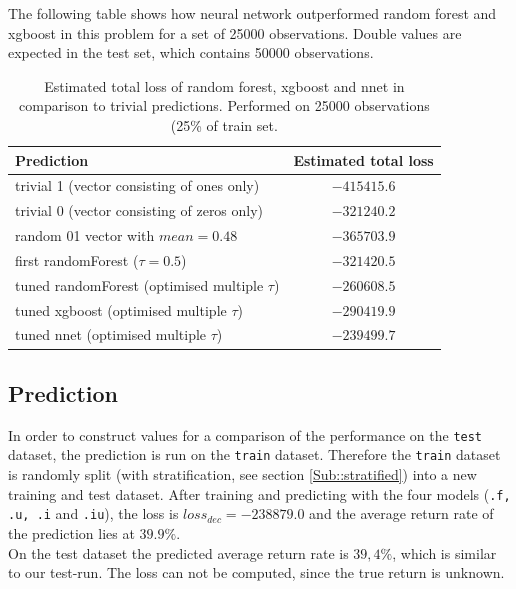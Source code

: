 \documentclass[a4paper,12pt]{article}
\begin{document}
The following table shows how neural network outperformed random forest and xgboost in this problem for a set of 25000 observations. Double values are expected in the test set, which contains 50000 observations.

\begin{table}[h]
\centering
\label{my-label}
\begin{tabular}{|lc|}
\hline
\textbf{Prediction} & \textbf{Estimated total loss} \\
\hline \hline
trivial 1 (vector consisting of ones only)                         &  $- 415415.6   $            \\
trivial 0 (vector consisting of zeros only)                       & $- 321240.2 $            \\
random 01 vector with $mean=0.48$                            &  $- 365703.9  $                \\
\hline
first randomForest ($\tau=0.5$)                                     & $- 321420.5$                \\
tuned randomForest (optimised multiple $\tau$)          &  $-260608.5$               \\
tuned xgboost (optimised multiple $\tau$)         & $-290419.9$ \\
tuned nnet (optimised multiple $\tau$)                          & $-239499.7$                   \\
\hline
\end{tabular}
\caption{Estimated total loss of random forest, xgboost and nnet in comparison to trivial predictions. Performed on 25000 observations (25\% of train set.}
\end{table}

\subsection{Prediction}
In order to construct values for a comparison of the performance on the \texttt{test} dataset, the prediction is run on the \texttt{train} dataset. Therefore the \texttt{train} dataset is randomly split (with stratification, see section \ref{Sub::stratified}) into a new training and test dataset. After training and predicting with the four models (\texttt{.f, .u, .i} and \texttt{.iu}), the loss is $loss_{dec} = -238879.0  $ and the average return rate of the prediction lies at $39.9 \%$.\\
On the test dataset the predicted average return rate is $39,4 \%$, which is similar to our test-run. The loss can not be computed, since the true return is unknown.\\
\end{document}
